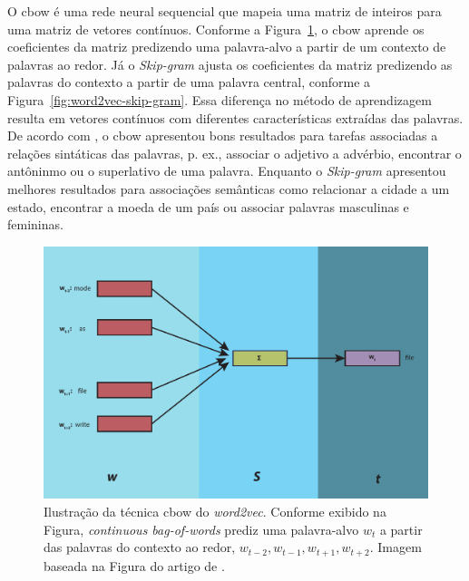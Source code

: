  O \acrshort{cbow} é uma rede neural sequencial que mapeia uma matriz de inteiros para uma matriz de vetores contínuos. Conforme a Figura~\ref{fig:word2vec-cbow}, o \acrshort{cbow} aprende os coeficientes da matriz predizendo uma palavra-alvo a partir de um contexto de palavras ao redor. Já o \textit{Skip-gram} ajusta os coeficientes da matriz predizendo as palavras do contexto a partir de uma palavra central, conforme a Figura~\ref{fig:word2vec-skip-gram}. Essa diferença no método de aprendizagem resulta em vetores contínuos com diferentes características extraídas das palavras. De acordo com \cite{mikolov2013distributed}, o \acrshort{cbow} apresentou bons resultados para tarefas associadas a relações sintáticas das palavras, p. ex., associar o adjetivo a advérbio, encontrar o antôninmo ou o superlativo de uma palavra. Enquanto o \textit{Skip-gram} apresentou melhores resultados para associações semânticas como relacionar a cidade a um estado, encontrar a moeda de um país ou associar palavras masculinas e femininas.

\begin{figure}[H]
\centering
\includegraphics[width=.8\textwidth]{figuras/cap-trabalhos-relacionados/word2vec-cbow.pdf}
\caption[Ilustração da técnica \acrlong{cbow} do \textit{word2vec}.]{Ilustração da técnica \acrlong{cbow} do \textit{word2vec}. Conforme exibido na Figura, \textit{continuous bag-of-words} prediz uma palavra-alvo $w_{t}$ a partir das palavras do contexto ao redor, $w_{t - 2}, w_{t - 1}, w_{t + 1}, w_{t + 2}$. Imagem baseada na Figura do artigo de \cite{mikolov2013distributed}.} 
\label{fig:word2vec-cbow}
\end{figure}

